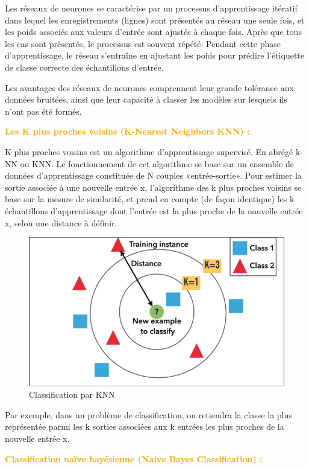 Les réseaux de neurones se caractérise par un processus d'apprentissage itératif dans lequel les enregistrements (lignes) sont présentés au réseau une seule fois, et les poids associés aux valeurs d'entrée sont ajustés à chaque fois. Après que tous les cas sont présentés, le processus est souvent répété. Pendant cette phase d'apprentissage, le réseau s'entraîne en ajustant les poids pour prédire l'étiquette de classe correcte des échantillons d'entrée.

Les avantages des réseaux de neurones comprennent leur grande tolérance aux données bruitées, ainsi que leur capacité à classer les modèles sur lesquels ils n'ont pas été formés.


\textcolor{Orange}{\textbf{Les K plus proches voisins (K-Nearest Neighbors KNN) :}}

K plus proches voisins est un algorithme d’apprentissage supervisé. En abrégé k-NN ou KNN.
Le fonctionnement de cet algorithme se base sur un ensemble de données d'apprentissage constituée de N couples «entrée-sortie». Pour estimer la sortie associée à une nouvelle entrée x, l'algorithme des k plus proches voisins se base sur la mesure de similarité, et prend en compte (de façon identique) les k échantillons d'apprentissage dont l’entrée est la plus proche de la nouvelle entrée x, selon une distance à définir.


\begin{figure}[H]
\begin{center}
\includegraphics[width=0.8\linewidth]{images/KNN.png}
\end{center}
\caption{Classification par KNN}
\label{fig:12}
\end{figure}


Par exemple, dans un problème de classification, on retiendra la classe la plus représentée parmi les k sorties associées aux k entrées les plus proches de la nouvelle entrée x.

\textcolor{Orange}{\textbf{Classification naïve bayésienne (Naive Bayes Classification) : }}
    
